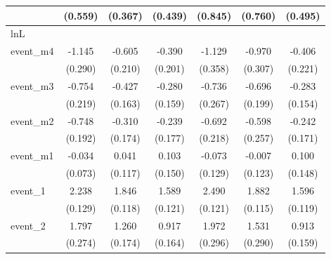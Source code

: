 {\begin{tabular}{l*{6}{c}}
            &     (0.559)         &     (0.367)         &     (0.439)         &     (0.845)         &     (0.760)         &     (0.495)         \\
\hline
lnL         &                     &                     &                     &                     &                     &                     \\
event\_m4    &      -1.145\sym{***}&      -0.605\sym{**} &      -0.390         &      -1.129\sym{**} &      -0.970\sym{**} &      -0.406         \\
            &     (0.290)         &     (0.210)         &     (0.201)         &     (0.358)         &     (0.307)         &     (0.221)         \\
[1em]
event\_m3    &      -0.754\sym{***}&      -0.427\sym{**} &      -0.280         &      -0.736\sym{**} &      -0.696\sym{***}&      -0.283         \\
            &     (0.219)         &     (0.163)         &     (0.159)         &     (0.267)         &     (0.199)         &     (0.154)         \\
[1em]
event\_m2    &      -0.748\sym{***}&      -0.310         &      -0.239         &      -0.692\sym{**} &      -0.598\sym{*}  &      -0.242         \\
            &     (0.192)         &     (0.174)         &     (0.177)         &     (0.218)         &     (0.257)         &     (0.171)         \\
[1em]
event\_m1    &      -0.034         &       0.041         &       0.103         &      -0.073         &      -0.007         &       0.100         \\
            &     (0.073)         &     (0.117)         &     (0.150)         &     (0.129)         &     (0.123)         &     (0.148)         \\
[1em]
event\_1     &       2.238\sym{***}&       1.846\sym{***}&       1.589\sym{***}&       2.490\sym{***}&       1.882\sym{***}&       1.596\sym{***}\\
            &     (0.129)         &     (0.118)         &     (0.121)         &     (0.121)         &     (0.115)         &     (0.119)         \\
[1em]
event\_2     &       1.797\sym{***}&       1.260\sym{***}&       0.917\sym{***}&       1.972\sym{***}&       1.531\sym{***}&       0.913\sym{***}\\
            &     (0.274)         &     (0.174)         &     (0.164)         &     (0.296)         &     (0.290)         &     (0.159)         \\

\end{tabular}}
